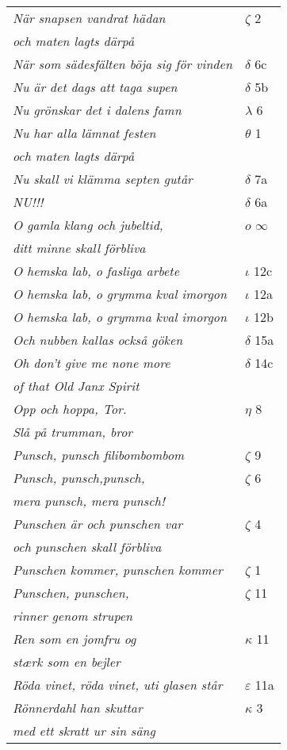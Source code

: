 \documentclass[a6paper,10pt]{article}
\begin{document}
\newpage
\setlength{\oddsidemargin}{-0.37in}
\begin{table}[!h]
\begin{tabular}{l l}
\textit{När snapsen vandrat hädan}	&$\zeta$ 2\\
\textit{och maten lagts därpå} &\\
\textit{När som sädesfälten böja sig för vinden}	&$\delta$ 6c\\
\textit{Nu är det dags att taga supen}	&$\delta$ 5b\\
\textit{Nu grönskar det i dalens famn}	&$\lambda$ 6\\
\textit{Nu har alla lämnat festen}	&$\theta$ 1\\
\textit{och maten lagts därpå} &\\
\textit{Nu skall vi klämma septen gutår}	&$\delta$ 7a\\
\textit{NU!!!}	&$\delta$ 6a\\
\textit{O gamla klang och jubeltid,}	&$o$ $\infty$\\
\textit{ditt minne skall förbliva} &\\
\textit{O hemska lab, o fasliga arbete}	&$\iota$ 12c\\
\textit{O hemska lab, o grymma kval imorgon}	&$\iota$ 12a\\
\textit{O hemska lab, o grymma kval imorgon}	&$\iota$ 12b\\
\textit{Och nubben kallas också göken}	&$\delta$ 15a\\
\textit{Oh don't give me none more}	&$\delta$ 14c\\
\textit{of that Old Janx Spirit} &\\
\textit{Opp och hoppa, Tor.}	&$\eta$ 8\\
\textit{Slå på trumman, bror} &\\
\textit{Punsch, punsch filibombombom}	&$\zeta$ 9\\
\textit{Punsch, punsch,punsch,}	&$\zeta$ 6\\
\textit{mera punsch, mera punsch!} &\\
\textit{Punschen är och punschen var}	&$\zeta$ 4\\
\textit{och punschen skall förbliva} &\\
\textit{Punschen kommer, punschen kommer}	&$\zeta$ 1\\
\textit{Punschen, punschen,}	&$\zeta$ 11\\
\textit{rinner genom strupen} &\\
\textit{Ren som en jomfru og}	&$\kappa$ 11\\
\textit{stærk som en bejler} &\\
\textit{Röda vinet, röda vinet, uti glasen står}	&$\varepsilon$ 11a\\
\textit{Rönnerdahl han skuttar}	&$\kappa$ 3\\
\textit{med ett skratt ur sin säng} &\\
\end{tabular}
\end{table}
\end{document}
